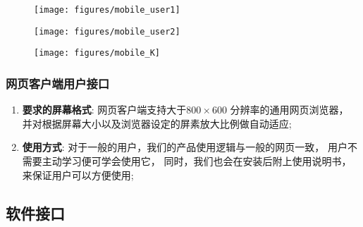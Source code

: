 \begin{figure}[h!]
  \centering

  \texttt{[image: figures/mobile\_user1]}

  \caption{  \label{fig:mobile_user1}
    }
\end{figure}
\begin{figure}[h!]
  \centering

  \texttt{[image: figures/mobile\_user2]}

  \caption{  \label{fig:mobile_user2}
    }
\end{figure}
\begin{figure}[h!]
  \centering

  \texttt{[image: figures/mobile\_K]}

  \caption{  \label{fig:mobile_K}
    }
\end{figure}
\fi

\subsubsection{网页客户端用户接口} %

\begin{enumerate}
	\item \textbf{要求的屏幕格式}:
		网页客户端支持大于$800 \times 600$ 分辨率的通用网页浏览器，
		并对根据屏幕大小以及浏览器设定的屏素放大比例做自动适应;
	\item \textbf{使用方式}:
		对于一般的用户，我们的产品使用逻辑与一般的网页一致，
			用户不需要主动学习便可学会使用它，
		同时，我们也会在安装后附上使用说明书，来保证用户可以方便使用;
\end{enumerate}

\subsection{软件接口}

